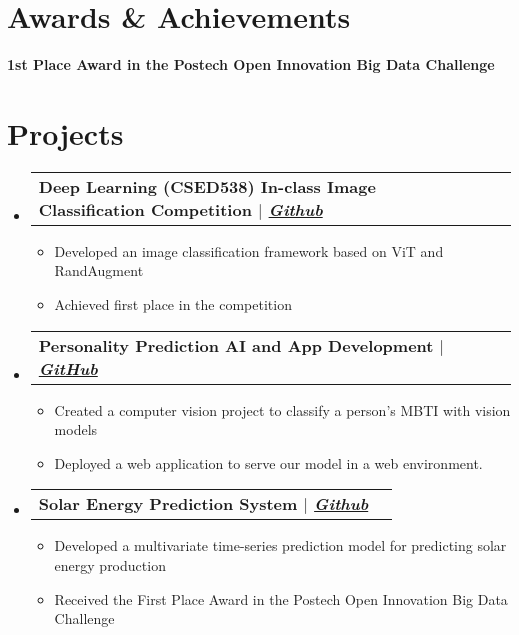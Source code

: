 \documentclass[letterpaper,11pt]{article}
\makeatletter
\newcommand{\resumeItem}[1]{
  \item\small{
    {#1 \vspace{-2pt}}
  }
}
\newcommand{\resumeProjectHeading}[1]{
  \vspace{-2pt}\item
    \begin{tabular*}{0.97\textwidth}[t]{l@{\extracolsep{\fill}}r}
      \textbf{#1} \\
    \end{tabular*}\vspace{-7pt}
}
\newcommand{\resumeSubHeadingListStart}{\begin{itemize}[leftmargin=0.15in, label={}]}
\newcommand{\resumeSubHeadingListEnd}{\end{itemize}}
\newcommand{\resumeItemListStart}{\begin{itemize}}
\newcommand{\resumeItemListEnd}{\end{itemize}\vspace{-5pt}}
\makeatother
\begin{document}

\section{Awards \& Achievements}
\vspace{2pt}
\resumeSubHeadingListStart
\small{\item{
              \textbf{1st Place Award in the Postech Open Innovation Big Data Challenge} \\ \vspace{3pt}
        }}
\resumeSubHeadingListEnd




\section{Projects}
\vspace{3pt}
\resumeSubHeadingListStart

\resumeProjectHeading
{\textbf{Deep Learning (CSED538) In-class Image Classification Competition} $|$ \emph{\href{https://github.com/happyhappy-jun/CSED538-final-project}{Github}}}
\resumeItemListStart
\resumeItem{Developed an image classification framework based on ViT and RandAugment}
\resumeItem{Achieved first place in the competition}
\resumeItemListEnd


\resumeProjectHeading
{\textbf{Personality Prediction AI and App Development} $|$ \emph{\href{https://github.com/hhyy0401/UGRP}{GitHub}}}
\resumeItemListStart
\resumeItem{Created a computer vision project to classify a person's MBTI with vision models}
\resumeItem{Deployed a web application to serve our model in a web environment.}
\resumeItemListEnd

\resumeProjectHeading
{\textbf{Solar Energy Prediction System} $|$ \emph{\href{https://github.com/happyhappy-jun/2020-Postech-Open-innovation-Bigdata-Challenge}{Github}}}
\resumeItemListStart
\resumeItem{Developed a multivariate time-series prediction model for predicting solar energy production}
\resumeItem{Received the First Place Award in the Postech Open Innovation Big Data Challenge}
\resumeItemListEnd
\resumeSubHeadingListEnd







\end{document}
